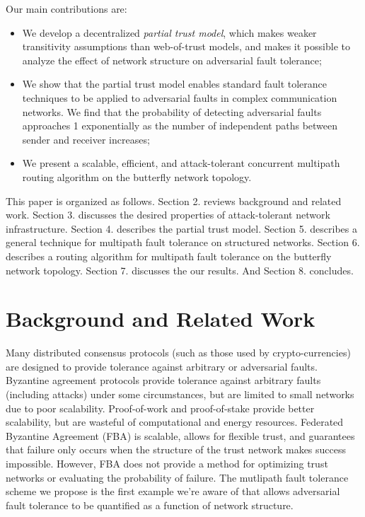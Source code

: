 \documentclass{sig-alternate-05-2015}
\begin{document}
Our main contributions are:
\begin{itemize}
\item{We develop a decentralized {\em partial trust model},
which makes weaker transitivity assumptions than web-of-trust models,
and makes it possible to analyze the effect of network structure on
adversarial fault tolerance;}
\item{We show that the partial trust model enables standard fault
tolerance techniques to be applied to adversarial faults in
complex communication networks.
We find that the probability of detecting adversarial faults
approaches 1 exponentially as the number of independent paths between
sender and receiver increases;}
\item{We present a scalable, efficient, and attack-tolerant concurrent
multipath routing algorithm on the butterfly network topology.}
\end{itemize}

This paper is organized as follows.
Section 2. reviews background and related work.
Section 3. discusses the desired properties of attack-tolerant network
infrastructure.
Section 4. describes the partial trust model.
Section 5. describes a general technique for multipath fault tolerance on
structured networks.
Section 6. describes a routing algorithm for multipath fault tolerance
on the butterfly network topology.
Section 7. discusses the our results.
And Section 8. concludes.

\section{Background and Related Work}

Many distributed consensus protocols (such as those used by crypto-currencies)
are designed to provide tolerance against arbitrary or adversarial faults.
Byzantine agreement protocols
\cite{lamport_byzantine_1982,castro_practical_1999}
provide tolerance against arbitrary faults (including attacks) under
some circumstances, but are limited to small networks due to poor scalability.
Proof-of-work \cite{dwork_pricing_1993,nakamoto_bitcoin:_2008}
and proof-of-stake \cite{king_ppcoin:_2012}
provide better scalability,
but are wasteful of computational and energy resources.
Federated Byzantine Agreement (FBA) \cite{mazieres_stellar_2015}
is scalable, allows for flexible trust,
and guarantees that failure only occurs when the structure of the trust
network makes success impossible.
However, FBA does not provide a method for optimizing trust networks or
evaluating the probability of failure.
The mutlipath fault tolerance scheme we propose is the
first example we're aware of that allows adversarial fault tolerance
to be quantified as a function of network structure.
\end{document}
